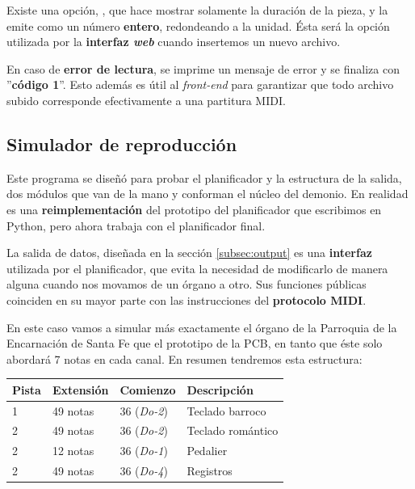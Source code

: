 \smallskip

Existe una opción, , que hace mostrar solamente la duración de la pieza, y la emite como un número \textbf{entero}, redondeando a la unidad. Ésta será la opción utilizada por la \textbf{interfaz \textit{web}} cuando insertemos un nuevo archivo.

En caso de \textbf{error de lectura}, se imprime un mensaje de error y se finaliza con ''\textbf{código 1}''. Esto además es útil al \textit{front-end} para garantizar que todo archivo subido corresponde efectivamente a una partitura \acrshort{MIDI}.

\subsection{Simulador de reproducción}
\label{subsec:simulador_reproduccion}

Este programa se diseñó para probar el planificador y la estructura de la salida, dos módulos que van de la mano y conforman el núcleo del demonio. En realidad es una \textbf{reimplementación} del prototipo del planificador que escribimos en Python, pero ahora trabaja con el planificador final.

La salida de datos, diseñada en la sección \ref{subsec:output} es una \textbf{interfaz} utilizada por el planificador, que evita la necesidad de modificarlo de manera alguna cuando nos movamos de un órgano a otro. Sus funciones públicas coinciden en su mayor parte con las instrucciones del \textbf{protocolo \acrshort{MIDI}}.

En este caso vamos a simular más exactamente el órgano de la Parroquia de la Encarnación de Santa Fe que el prototipo de la \acrshort{PCB}, en tanto que éste solo abordará 7 notas en cada canal. En resumen tendremos esta estructura:

\smallskip

\begin{center}
	\begin{tabular}{|l|l|l|l|}
		\hline \textbf{Pista} & \textbf{Extensión} & \textbf{Comienzo} & \textbf{Descripción} \\ 
		\hline 1 & 49 notas & 36 (\textit{Do-2}) & Teclado barroco \\
		\hline 2 & 49 notas & 36 (\textit{Do-2}) & Teclado romántico \\
		\hline 2 & 12 notas & 36 (\textit{Do-1}) & Pedalier \\
		\hline 2 & 49 notas & 36 (\textit{Do-4}) & Registros \\
		\hline 
	\end{tabular}
	\smallskip
\end{center}

